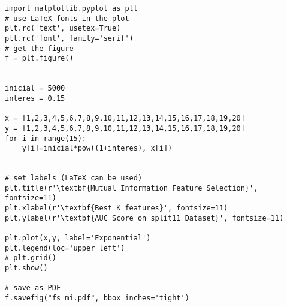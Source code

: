 \begin{lstlisting}
import matplotlib.pyplot as plt
# use LaTeX fonts in the plot
plt.rc('text', usetex=True)
plt.rc('font', family='serif')
# get the figure
f = plt.figure()


inicial = 5000
interes = 0.15

x = [1,2,3,4,5,6,7,8,9,10,11,12,13,14,15,16,17,18,19,20]
y = [1,2,3,4,5,6,7,8,9,10,11,12,13,14,15,16,17,18,19,20]
for i in range(15):
    y[i]=inicial*pow((1+interes), x[i])


# set labels (LaTeX can be used)
plt.title(r'\textbf{Mutual Information Feature Selection}', fontsize=11)
plt.xlabel(r'\textbf{Best K features}', fontsize=11)
plt.ylabel(r'\textbf{AUC Score on split11 Dataset}', fontsize=11)

plt.plot(x,y, label='Exponential')
plt.legend(loc='upper left')
# plt.grid()
plt.show()

# save as PDF
f.savefig("fs_mi.pdf", bbox_inches='tight')
\end{lstlisting}


